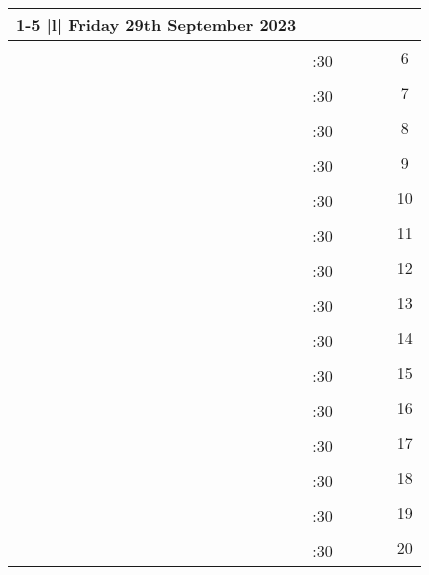 \documentclass[10pt, a5paper, final, oneside]{memoir}
\newcommand{\grayline}{\arrayrulecolor{lightgray}\cline{1-5}\arrayrulecolor{black}}
\begin{document}
\noindent
\begin{tabularx}{\linewidth}{|c|c|X|X|X|c}

    \cline{1-5}
    \multicolumn{5} {|l|} {Friday 29th September 2023} \\
    \hline

    & & & && \multirow{2}{*}{6}\\ 
    \grayline
    & :30 & & &&\\ \hline

    & & & && \multirow{2}{*}{7}\\ 
    \grayline
    & :30 & & &&\\ \hline

    & & & && \multirow{2}{*}{8}\\ 
    \grayline
    & :30 & & &&\\ \hline

    & & & && \multirow{2}{*}{9}\\ 
    \grayline
    & :30 & & &&\\ \hline
    
    & & & && \multirow{2}{*}{10}\\ 
    \grayline
    & :30 & & &&\\ \hline

    & & & && \multirow{2}{*}{11}\\ 
    \grayline
    & :30 & & &&\\ \hline

    & & & && \multirow{2}{*}{12}\\ 
    \grayline
    & :30 & & &&\\ \hline

    & & & && \multirow{2}{*}{13}\\ 
    \grayline
    & :30 & & &&\\ \hline

    & & & && \multirow{2}{*}{14}\\ 
    \grayline
    & :30 & & &&\\ \hline
    
    & & & && \multirow{2}{*}{15}\\ 
    \grayline
    & :30 & & &&\\ \hline

    & & & && \multirow{2}{*}{16}\\ 
    \grayline
    & :30 & & &&\\ \hline

    & & & && \multirow{2}{*}{17}\\ 
    \grayline
    & :30 & & &&\\ \hline

    & & & && \multirow{2}{*}{18}\\ 
    \grayline
    & :30 & & &&\\ \hline

    & & & && \multirow{2}{*}{19}\\ 
    \grayline
    & :30 & & &&\\ \hline
    
    & & & && \multirow{2}{*}{20}\\ 
    \grayline
    & :30 & & &&\\ \hline

\end{tabularx}
\end{document}
